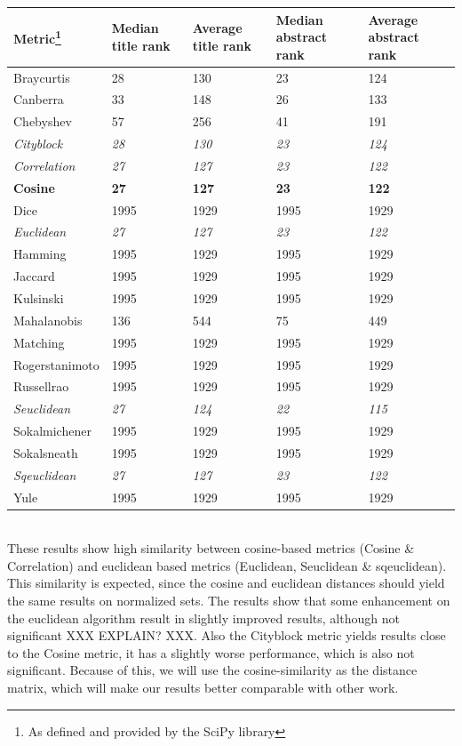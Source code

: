 \documentclass[../../Thesis.tex]{subfiles}
\begin{document}
\begin{minipage}{6.5in}
\begin{tabular}{|l|l|l|l|l|}
\hline
Metric\footnote{As defined and provided by the SciPy library} & Median title rank & Average title rank & Median abstract rank & Average abstract rank  \\
\hline
Braycurtis & 28 & 130 & 23 & 124  \\
\hline
Canberra & 33 & 148 & 26 & 133  \\
\hline
Chebyshev & 57 & 256 & 41 & 191  \\
\hline
\textit{Cityblock} & \textit{28} & \textit{130} & \textit{23} & \textit{124}  \\
\hline
\textit{Correlation} & \textit{27} & \textit{127} & \textit{23} & \textit{122}  \\
\hline
\textbf{Cosine} & \textbf{27} & \textbf{127} & \textbf{23} & \textbf{122}  \\
\hline
Dice & 1995 & 1929 & 1995 & 1929  \\
\hline
\textit{Euclidean} & \textit{27} & \textit{127} & \textit{23} & \textit{122}  \\
\hline
Hamming & 1995 & 1929 & 1995 & 1929  \\
\hline
Jaccard & 1995 & 1929 & 1995 & 1929  \\
\hline
Kulsinski & 1995 & 1929 & 1995 & 1929  \\
\hline
Mahalanobis & 136 & 544 & 75 & 449  \\
\hline
Matching & 1995 & 1929 & 1995 & 1929  \\
\hline
Rogerstanimoto & 1995 & 1929 & 1995 & 1929  \\
\hline
Russellrao & 1995 & 1929 & 1995 & 1929  \\
\hline
\textit{Seuclidean} & \textit{27} & \textit{124} & \textit{22} & \textit{115}  \\
\hline
Sokalmichener & 1995 & 1929 & 1995 & 1929  \\
\hline
Sokalsneath & 1995 & 1929 & 1995 & 1929  \\
\hline
\textit{Sqeuclidean} & \textit{27} & \textit{127} & \textit{23} & \textit{122}  \\
\hline
Yule & 1995 & 1929 & 1995 & 1929  \\
\hline
\end{tabular}
\end{minipage}\\
These results show high similarity between cosine-based metrics (Cosine \& Correlation) and euclidean based metrics (Euclidean, Seuclidean \& sqeuclidean). This similarity is expected, since the cosine and euclidean distances should yield the same results on normalized sets. The results show that some enhancement on the euclidean algorithm result in slightly improved results, although not significant XXX EXPLAIN? XXX. Also the Cityblock metric yields results close to the Cosine metric, it has a slightly worse performance, which is also not significant. Because of this, we will use the cosine-similarity as the distance matrix, which will make our results better comparable with other work.
\end{document}
